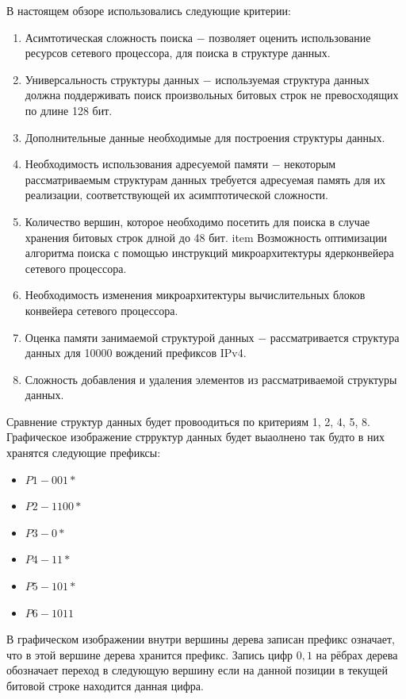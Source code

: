 \documentclass[a4peper, 12pt, titlepage, finall]{report}
\begin{document}
        В настоящем обзоре использовались следующие критерии:
        \begin{enumerate}
            \item Асимтотическая сложность поиска $-$ позволяет оценить использование ресурсов сетевого процессора, для поиска в структуре данных.
            \item Универсальность структуры данных $-$ используемая структура данных должна поддерживать поиск произвольных битовых строк
                  не превосходящих по длине 128 бит.
            \item Дополнительные данные необходимые для построения структуры данных.
            \item Необходимость использования адресуемой памяти $-$ некоторым рассматриваемым структурам данных требуется адресуемая память для их реализации, соответствующей их асимптотической сложности.
            \item Количество вершин, которое необходимо посетить для поиска в случае хранения битовых строк длной до 48 бит.
            item Возможность оптимизации алгоритма поиска с помощью инструкций микроархитектуры ядерконвейера сетевого процессора.
            \item Необходимость изменения микроархитектуры вычислительных блоков конвейера сетевого процессора.
            \item Оценка памяти занимаемой структурой данных $-$ рассматривается структура данных для 10000 вождений префиксов IPv4.
            \item Сложность добавления и удаления элементов из рассматриваемой структуры данных.
        \end{enumerate}

        Сравнение структур данных будет провоодиться по критериям 1, 2, 4, 5, 8.
        \newpage
        Графическое изображение стрруктур данных будет выаолнено так будто в них хранятся следующие префиксы:
        \begin{itemize}
            \item $P1 - 001*$
            \item $P2 - 1100*$
            \item $P3 - 0*$
            \item $P4 - 11*$
            \item $P5 - 101*$
            \item $P6 - 1011$
        \end{itemize}
        В графическом изображении внутри вершины дерева записан префикс означает, что в этой вершине дерева хранится префикс.
        Запись цифр ${0,1}$ на рёбрах дерева обозначает переход в следующую вершину если на данной позиции в текущей битовой строке находится данная цифра.
\end{document}
